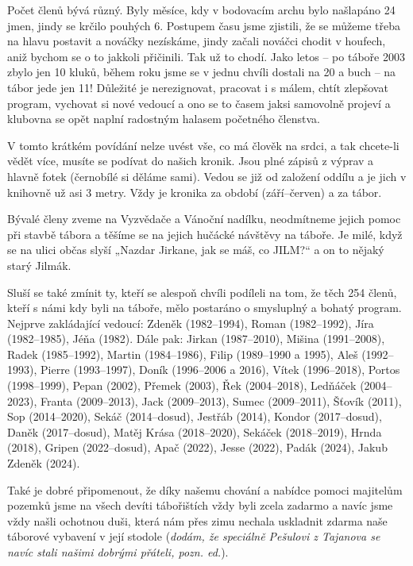 Počet členů bývá různý. Byly měsíce, kdy v bodovacím archu bylo
našlapáno 24 jmen, jindy se krčilo pouhých 6. Postupem času jsme
zjistili, že se můžeme třeba na hlavu postavit a nováčky nezískáme,
jindy začali nováčci chodit v houfech, aniž bychom se o to jakkoli
přičinili. Tak už to chodí. Jako letos -- po táboře 2003 zbylo jen 10
kluků, během roku jsme se v jednu chvíli dostali na 20 a buch -- na
tábor jede jen 11! Důležité je nerezignovat, pracovat i s málem, chtít
zlepšovat program, vychovat si nové vedoucí a ono se to časem jaksi
samovolně projeví a klubovna se opět naplní radostným halasem početného
členstva.

V tomto krátkém povídání nelze uvést vše, co má člověk na srdci, a tak
chcete-li vědět více, musíte se podívat do našich kronik. Jsou plné
zápisů z výprav a hlavně fotek (černobílé si děláme sami). Vedou se již
od založení oddílu a je jich v knihovně už asi 3 metry. Vždy je kronika
za období (září--červen) a za tábor.

Bývalé členy zveme na Vyzvědače a Vánoční nadílku, neodmítneme jejich
pomoc při stavbě tábora a těšíme se na jejich hučácké návštěvy na
táboře. Je milé, když se na ulici občas slyší „Nazdar Jirkane, jak se
máš, co JILM?{}`` a on to nějaký starý Jilmák.

Sluší se také zmínit ty, kteří se alespoň chvíli podíleli na tom, že
těch 254 členů, kteří s námi kdy byli na táboře, mělo postaráno o
smysluplný a bohatý program. Nejprve zakládající vedoucí: Zdeněk
(1982--1994), Roman (1982--1992), Jíra (1982--1985), Jéňa (1982). Dále
pak: Jirkan (1987--2010), Mišina (1991--2008), Radek (1985--1992),
Martin (1984--1986), Filip (1989--1990 a 1995), Aleš (1992--1993),
Pierre (1993--1997), Doník (1996--2006 a 2016), Vítek (1996--2018),
Portos (1998--1999), Pepan (2002), Přemek (2003), Řek (2004--2018),
Ledňáček (2004--2023), Franta (2009--2013), Jack (2009--2013), Sumec
(2009--2011), Šťovík (2011), Sop (2014--2020), Sekáč (2014--dosud),
Jestřáb (2014), Kondor (2017--dosud), Daněk (2017--dosud), Matěj Krása
(2018--2020), Sekáček (2018--2019), Hrnda (2018), Gripen (2022--dosud),
Apač (2022), Jesse (2022), Padák (2024), Jakub Zdeněk (2024).

Také je dobré připomenout, že díky našemu chování a nabídce pomoci
majitelům pozemků jsme na všech devíti tábořištích vždy byli zcela
zadarmo a navíc jsme vždy našli ochotnou duši, která nám přes zimu
nechala uskladnit zdarma naše táborové vybavení v její stodole
(\emph{dodám, že speciálně Pešulovi z Tajanova se navíc stali našimi
dobrými přáteli, pozn. ed.}).

